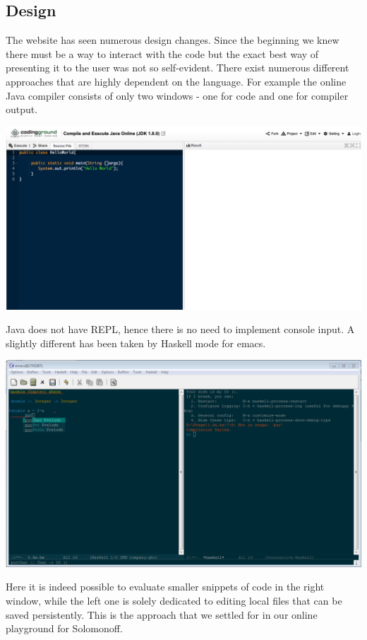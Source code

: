 \subsection{Design}

The website has seen numerous design changes. Since the beginning we knew there must be a way to interact with the code but the exact best way of presenting it to the user was not so self-evident. There exist numerous different approaches that are highly dependent on the language. For example the online  Java  compiler consists of only two windows - one for code and one for compiler output.
\begin{center}
\includegraphics[scale=0.3]{java.png}
\end{center}
Java does not have REPL, hence there is no need to implement console input.
A slightly different has been taken by Haskell mode for emacs. 
\begin{center}
     \includegraphics[scale=0.45]{haskell.png}
\end{center}
Here it is indeed possible to evaluate smaller snippets of code in the right window, while the left one is solely dedicated to editing local files that can be saved persistently. This is the approach that we settled for in our online playground for Solomonoff. 
